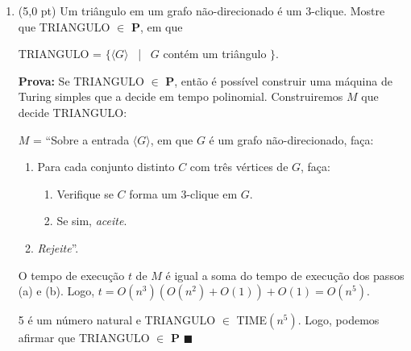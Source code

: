 \documentclass[12pt,a4paper,oneside]{article}
\begin{document}
\begin{enumerate}
	\newpage
	
	\item (5,0 pt) Um triângulo em um grafo não-direcionado é um 3-clique. Mostre que TRIANGULO $\in$ {\bf P}, em que 
	\begin{center}
		TRIANGULO = $\{ \langle G \rangle$ \mbox{ | } $G$ contém um triângulo $\}$.
	\end{center}
		{ \color{verde}
				{\bf Prova:} Se TRIANGULO $\in$ {\bf P}, então é possível construir uma máquina de Turing simples que a decide em tempo polinomial. Construiremos $M$ que decide TRIANGULO:
			
			$M$ = ``Sobre a entrada $\langle G \rangle$, em que $G$ é um grafo não-direcionado, faça:
			\begin{enumerate}
				\item Para cada conjunto distinto $C$ com três vértices de $G$, faça:
					\begin{enumerate}
						\item Verifique se $C$ forma um 3-clique em $G$.
						\item Se sim, {\it aceite}.
					\end{enumerate}
				\item {\it Rejeite}''.
			\end{enumerate}
			
			O tempo de execução $t$ de $M$ é igual a soma do tempo de execução dos passos (a) e (b). Logo, $t = O(n^3)(O(n^2) + O(1)) + O(1)= O(n^5)$. 
			
			5 é um número natural e TRIANGULO $\in$ {\sc TIME}$(n^5)$. Logo, podemos afirmar que TRIANGULO $\in$ {\bf P} $\blacksquare$
			}
			
\end{enumerate}
\end{document}
